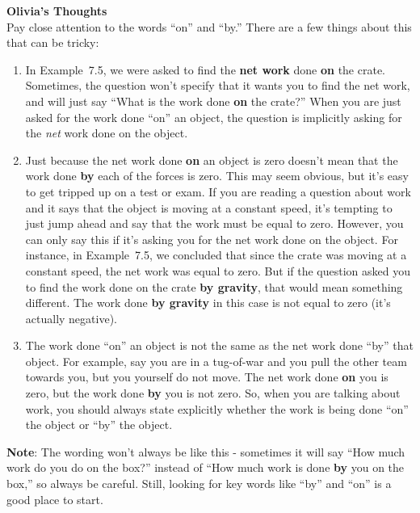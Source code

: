 \begin{framed}
\textbf{Olivia's Thoughts}\\
Pay close attention to the words ``on'' and ``by.'' There are a few things about this that can be tricky:

\begin{enumerate}
\item In Example~7.5, we were asked to find the \textbf{net work} done \textbf{on} the crate. Sometimes, the question won't specify that it wants you to find the net work, and will just say ``What is the work done \textbf{on} the crate?'' When you are just asked for the work done ``on'' an object, the question is implicitly asking for the \textit{net} work done on the object.
\item Just because the net work done \textbf{on} an object is zero doesn't mean that the work done \textbf{by} each of the forces is zero. This may seem obvious, but it's easy to get tripped up on a test or exam. If you are reading a question about work and it says that the object is moving at a constant speed, it's tempting to just jump ahead and say that the work must be equal to zero. However, you can only say this if it's asking you for the net work done on the object. For instance, in Example~7.5, we concluded that since the crate was moving at a constant speed, the net work was equal to zero. But if the question asked you to find the work done on the crate \textbf{by gravity}, that would mean something different. The work done \textbf{by gravity} in this case is not equal to zero (it's actually negative).
\item The work done ``on'' an object is not the same as the net work done ``by'' that object. For example, say you are in a tug-of-war and you pull the other team towards you, but you yourself do not move. The net work done \textbf{on} you is zero, but the work done \textbf{by} you is not zero. So, when you are talking about work, you should always state explicitly whether the work is being done ``on'' the object or ``by'' the object.
\end{enumerate}

\textbf{Note}: The wording won't always be like this - sometimes it will say ``How much work do you do on the box?'' instead of ``How much work is done \textbf{by} you on the box,'' so always be careful. Still, looking for key words like ``by'' and ``on'' is a good place to start.
\end{framed}

